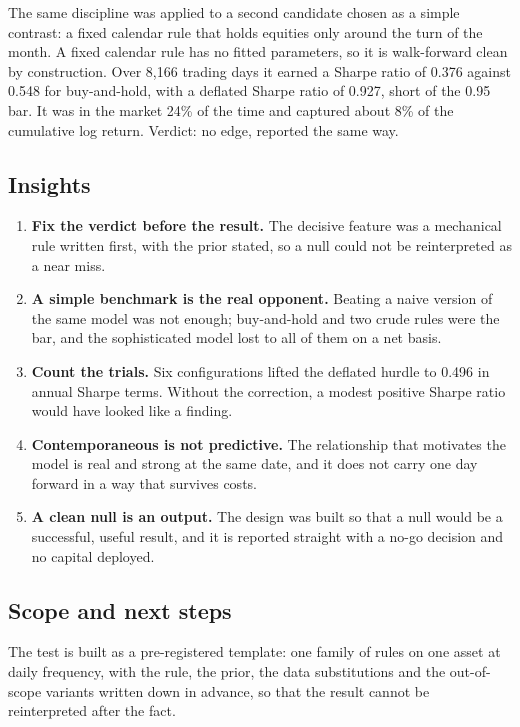 \documentclass[
  british,
  a4paper,
]{article}
\providecommand{\tightlist}{%
  \setlength{\itemsep}{0pt}\setlength{\parskip}{0pt}}
\begin{document}
The same discipline was applied to a second candidate chosen as a simple
contrast: a fixed calendar rule that holds equities only around the turn
of the month. A fixed calendar rule has no fitted parameters, so it is
walk-forward clean by construction. Over 8,166 trading days it earned a
Sharpe ratio of 0.376 against 0.548 for buy-and-hold, with a deflated
Sharpe ratio of 0.927, short of the 0.95 bar. It was in the market 24\%
of the time and captured about 8\% of the cumulative log return.
Verdict: no edge, reported the same way.

\subsection{Insights}\label{insights}

\begin{enumerate}
\def\labelenumi{\arabic{enumi}.}
\tightlist
\item
  \textbf{Fix the verdict before the result.} The decisive feature was a
  mechanical rule written first, with the prior stated, so a null could
  not be reinterpreted as a near miss.
\item
  \textbf{A simple benchmark is the real opponent.} Beating a naive
  version of the same model was not enough; buy-and-hold and two crude
  rules were the bar, and the sophisticated model lost to all of them on
  a net basis.
\item
  \textbf{Count the trials.} Six configurations lifted the deflated
  hurdle to 0.496 in annual Sharpe terms. Without the correction, a
  modest positive Sharpe ratio would have looked like a finding.
\item
  \textbf{Contemporaneous is not predictive.} The relationship that
  motivates the model is real and strong at the same date, and it does
  not carry one day forward in a way that survives costs.
\item
  \textbf{A clean null is an output.} The design was built so that a
  null would be a successful, useful result, and it is reported straight
  with a no-go decision and no capital deployed.
\end{enumerate}

\subsection{Scope and next steps}\label{scope-and-next-steps}

The test is built as a pre-registered template: one family of rules on
one asset at daily frequency, with the rule, the prior, the data
substitutions and the out-of-scope variants written down in advance, so
that the result cannot be reinterpreted after the fact.
\end{document}

